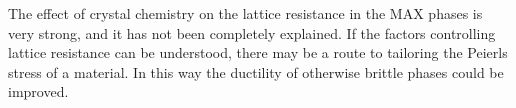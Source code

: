 The effect of crystal chemistry on the lattice resistance in the MAX phases is very strong, and it has not been completely explained. If the factors controlling lattice resistance can be understood, there may be a route to tailoring the Peierls stress of a material. In this way the ductility of otherwise brittle phases could be improved.

























































